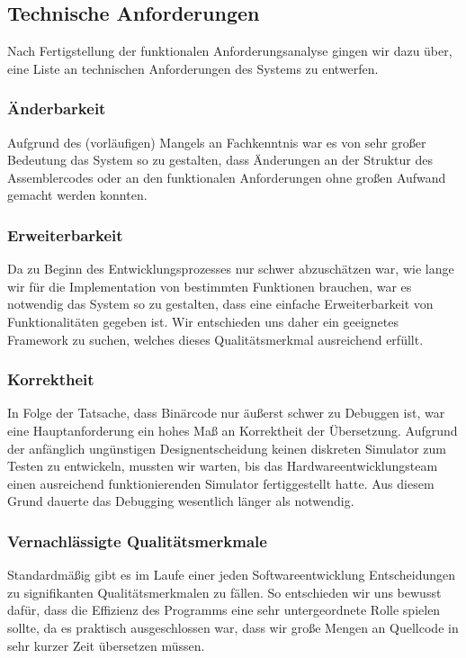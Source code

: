 \documentclass[paper=a4,fontsize=12pt,twocolumn]{scrreprt}
\begin{document}
\subsection{Technische Anforderungen}
Nach Fertigstellung der funktionalen Anforderungsanalyse gingen wir dazu über, eine Liste an technischen Anforderungen des Systems zu entwerfen.

\subsubsection{Änderbarkeit}
Aufgrund des (vorläufigen) Mangels an Fachkenntnis war es von sehr großer Bedeutung das System so zu gestalten, dass Änderungen an der Struktur des Assemblercodes oder an den funktionalen Anforderungen ohne großen Aufwand gemacht werden konnten.

\subsubsection{Erweiterbarkeit}
Da zu Beginn des Entwicklungsprozesses nur schwer abzuschätzen war, wie lange wir für die Implementation von bestimmten Funktionen brauchen, war es notwendig das System so zu gestalten, dass eine einfache Erweiterbarkeit von Funktionalitäten gegeben ist. Wir entschieden uns daher ein geeignetes Framework zu suchen, welches dieses Qualitätsmerkmal ausreichend erfüllt. 

\subsubsection{Korrektheit}
In Folge der Tatsache, dass Binärcode nur äußerst schwer zu Debuggen ist, war eine Hauptanforderung ein hohes Maß an Korrektheit der Übersetzung.
Aufgrund der anfänglich ungünstigen Designentscheidung keinen diskreten Simulator zum Testen zu entwickeln, mussten wir warten, bis das Hardwareentwicklungsteam einen ausreichend funktionierenden Simulator fertiggestellt hatte. Aus diesem Grund dauerte das Debugging wesentlich länger als notwendig.

\subsubsection{Vernachlässigte Qualitätsmerkmale}
Standardmäßig gibt es im Laufe einer jeden Softwareentwicklung Entscheidungen zu signifikanten Qualitätsmerkmalen zu fällen.
So entschieden wir uns bewusst dafür, dass die Effizienz des Programms eine sehr untergeordnete Rolle spielen sollte, da es praktisch ausgeschlossen war, dass wir große Mengen an Quellcode in sehr kurzer Zeit übersetzen müssen.
\end{document}

